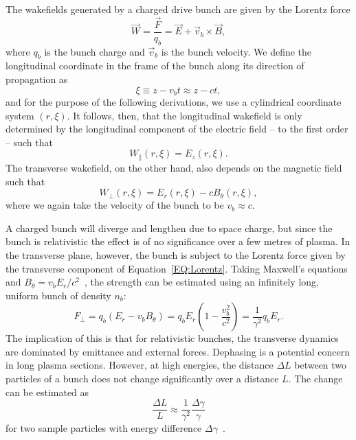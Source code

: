 The wakefields generated by a charged drive bunch are given by the Lorentz force
\begin{equation}
    \vec{W} = \frac{\vec{F}}{q_{b}} = \vec{E} + \vec{v}_{b} \times \vec{B}, \label{EQ:Lorentz}
\end{equation}
where $q_{b}$ is the bunch charge and $\vec{v}_{b}$ is the bunch velocity.
We define the longitudinal coordinate in the frame of the bunch along its direction of propagation as
\begin{equation}
    \xi \equiv z - v_{b}t \approx z - ct, \label{EQ:Xi}
\end{equation}
and for the purpose of the following derivations, we use a cylindrical coordinate system $(r, \xi)$.
It follows, then, that the longitudinal wakefield is only determined by the longitudinal component of the electric field -- to the first order -- such that
\begin{equation}
    W_{\parallel}(r,\xi) = E_{z}(r,\xi). \label{EQ:Wz}
\end{equation}
The transverse wakefield, on the other hand, also depends on the magnetic field such that
\begin{equation}
    W_{\perp}(r,\xi) = E_{r}(r,\xi) - cB_{\theta}(r,\xi), \label{EQ:Wr}
\end{equation}
where we again take the velocity of the bunch to be $v_{b} \approx c$.

A charged bunch will diverge and lengthen due to space charge, but since the bunch is relativistic the effect is of no significance over a few metres of plasma.
In the transverse plane, however, the bunch is subject to the Lorentz force given by the transverse component of Equation~\ref{EQ:Lorentz}.
Taking Maxwell's equations and $B_{\theta} = v_{b}E_{r}/c^{2}$~\cite{schindl:1999}, the strength can be estimated using an infinitely long, uniform bunch of density $n_{b}$:
\begin{equation}
    F_{\perp} = q_{b}(E_{r} - v_{b}B_{\theta})
              = q_{b}E_{r}\left(1 - \frac{v_{b}^{2}}{c^{2}}\right)
              = \frac{1}{\gamma^2}q_{b}E_{r}. \label{EQ:DeFocR}
\end{equation}
The implication of this is that for relativistic bunches, the transverse dynamics are dominated by emittance and external forces.
Dephasing is a potential concern in long plasma sections.
However, at high energies, the distance $\Delta L$ between two particles of a bunch does not change significantly over a distance $L$.
The change can be estimated as
\begin{equation}
    \frac{\Delta L}{L} \approx \frac{1}{\gamma^{2}}\frac{\Delta\gamma}{\gamma} \label{EQ:DePhL}
\end{equation}
for two sample particles with energy difference $\Delta\gamma$~\cite{muggli:2017}.

